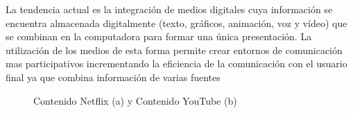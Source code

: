 La tendencia actual es la integración de medios digitales cuya información se encuentra almacenada digitalmente (texto,
gráficos, animación, voz y vídeo) que se combinan en la computadora para formar una única presentación. La utilización de los medios de esta forma permite crear entornos de comunicación mas participativos incrementando la eficiencia de la comunicación con el usuario final ya que combina información de varias fuentes 
\begin{figure}[!h]
\centering
{}
\caption{Contenido Netflix (a) y Contenido YouTube (b)}
\end{figure}

